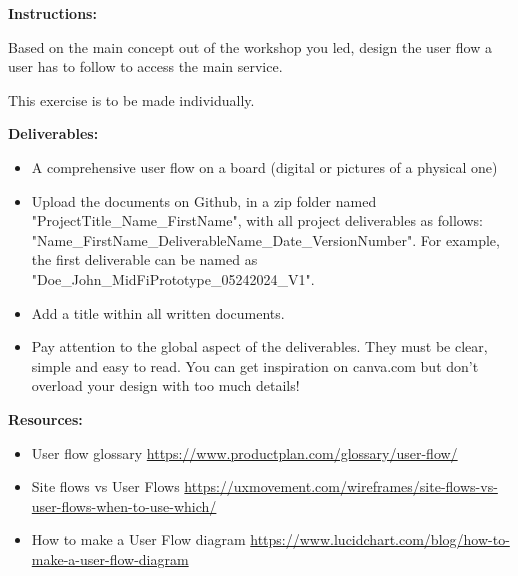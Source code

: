 \makeheaderfiles

\textbf{Instructions:}

Based on the main concept out of the workshop you led, design the user flow a user has to follow to access the main service.

This exercise is to be made individually.

\textbf{Deliverables:}

\begin{itemize}
\item A comprehensive user flow on a board (digital or pictures of a physical one)
\item Upload the documents on Github, in a zip folder named "ProjectTitle\_Name\_FirstName", with all project deliverables as follows: "Name\_FirstName\_DeliverableName\_Date\_VersionNumber".  For example, the first deliverable can be named as "Doe\_John\_MidFiPrototype\_05242024\_V1".
\item Add a title within all written documents.
\item Pay attention to the global aspect of the deliverables. They must be clear, simple and easy to read. You can get inspiration on canva.com but don't overload your design with too much details!
\end{itemize}

\textbf{Resources:}

\begin{itemize}
\item User flow glossary \url{https://www.productplan.com/glossary/user-flow/}
\item Site flows vs User Flows \url{https://uxmovement.com/wireframes/site-flows-vs-user-flows-when-to-use-which/}
\item How to make a User Flow diagram \url{https://www.lucidchart.com/blog/how-to-make-a-user-flow-diagram}
\end{itemize}

